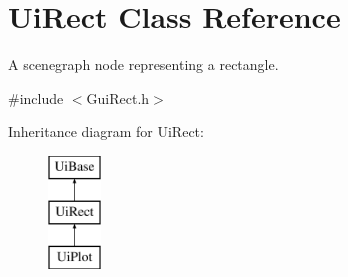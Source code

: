 \hypertarget{class_ui_rect}{\section{Ui\-Rect Class Reference}
\label{class_ui_rect}
}


A scenegraph node representing a rectangle.  




{\ttfamily \#include $<$Gui\-Rect.\-h$>$}

Inheritance diagram for Ui\-Rect\-:\begin{figure}[H]
\begin{center}
\leavevmode
\includegraphics[height=3.000000cm]{class_ui_rect}
\end{center}
\end{figure}
